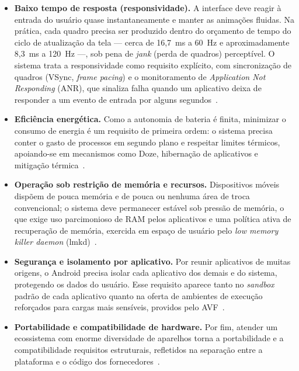 \documentclass[12pt,a4paper]{article}
\begin{document}
\begin{itemize}[leftmargin=*]
  \item \textbf{Baixo tempo de resposta (responsividade).} A interface deve reagir à
    entrada do usuário quase instantaneamente e manter as animações fluidas. Na
    prática, cada quadro precisa ser produzido dentro do orçamento de tempo do ciclo
    de atualização da tela --- cerca de 16,7~ms a 60~Hz e aproximadamente 8,3~ms a
    120~Hz ---, sob pena de \emph{jank} (perda de quadros) perceptível. O sistema
    trata a responsividade como requisito explícito, com sincronização de quadros
    (VSync, \emph{frame pacing}) e o monitoramento de \emph{Application Not
    Responding} (ANR), que sinaliza falha quando um aplicativo deixa de responder a
    um evento de entrada por alguns segundos~\cite{androidperf,androidruntime}.

  \item \textbf{Eficiência energética.} Como a autonomia de bateria é finita,
    minimizar o consumo de energia é um requisito de primeira ordem: o sistema
    precisa conter o gasto de processos em segundo plano e respeitar limites
    térmicos, apoiando-se em mecanismos como Doze, hibernação de aplicativos e
    mitigação térmica~\cite{androidperf}.

  \item \textbf{Operação sob restrição de memória e recursos.} Dispositivos móveis
    dispõem de pouca memória e de pouca ou nenhuma área de troca convencional; o
    sistema deve permanecer estável sob pressão de memória, o que exige uso
    parcimonioso de RAM pelos aplicativos e uma política ativa de recuperação de
    memória, exercida em espaço de usuário pelo \emph{low memory killer daemon}
    (lmkd)~\cite{androidperf}.

  \item \textbf{Segurança e isolamento por aplicativo.} Por reunir aplicativos de
    muitas origens, o Android precisa isolar cada aplicativo dos demais e do
    sistema, protegendo os dados do usuário. Esse requisito aparece tanto no
    \emph{sandbox} padrão de cada aplicativo quanto na oferta de ambientes de
    execução reforçados para cargas mais sensíveis, providos pelo
    AVF~\cite{aosp,androidavf}.

  \item \textbf{Portabilidade e compatibilidade de hardware.} Por fim, atender um
    ecossistema com enorme diversidade de aparelhos torna a portabilidade e a
    compatibilidade requisitos estruturais, refletidos na separação entre a
    plataforma e o código dos fornecedores~\cite{aospkernel,treble}.
\end{itemize}
\end{document}
